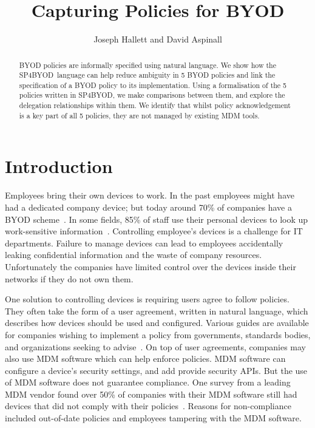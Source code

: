 \documentclass{llncs}
\title{Capturing Policies for BYOD}
\author{Joseph Hallett and David Aspinall}
\institute{School of Informatics, University of Edinburgh}
\newcommand{\AppPAL}[0]{SP4BYOD}
\begin{document}
\maketitle
\begin{abstract}
  BYOD policies are informally specified using natural language.
  We show how the \AppPAL~language can help reduce ambiguity in 5 BYOD policies and link the specification of a BYOD policy to its implementation.
  Using a formalisation of the 5 policies written in \AppPAL, we make comparisons between them, and explore the delegation relationships within them.
  We identify that whilst policy acknowledgement is a key part of all 5 policies, they are not managed by existing MDM tools.
\end{abstract}
\section{Introduction}
\label{sec:intro}

Employees bring their own devices to work.
In the past employees might have had a dedicated company device; 
  but today around 70\% of companies have a BYOD scheme~\cite{schulze_byod_2016}. 
In some fields, 85\% of staff use their personal devices to look up work-sensitive information~\cite{patel_uk_2015}.
Controlling employee's devices is a challenge for IT departments.
Failure to manage devices can lead to employees accidentally leaking confidential information and the waste of company resources.
Unfortunately the companies have limited control over the devices inside their networks if they do not own them.

One solution to controlling devices is requiring users agree to follow policies.
They often take the form of a user agreement, written in natural language, which describes how devices should be used and configured.
Various guides are available for companies wishing to implement a policy from governments, standards bodies, and organizations seeking to advise~\cite{nicholas_r._c._guerin_security_2008,souppaya_guidelines_????,cesg_byod_2015}.
On top of user agreements, companies may also use \ac{MDM} software which can help enforce policies.
\ac{MDM} software can configure a device's security settings, and add provide security APIs.
But the use of \ac{MDM} software does not guarantee compliance.
One survey from a leading MDM vendor found over 50\% of companies with their \ac{MDM} software still had devices that did not comply with their policies~\cite{mobileiron_security_labs_q4_2015}.
Reasons for non-compliance included out-of-date policies and employees tampering with the \ac{MDM} software.
\end{document}
